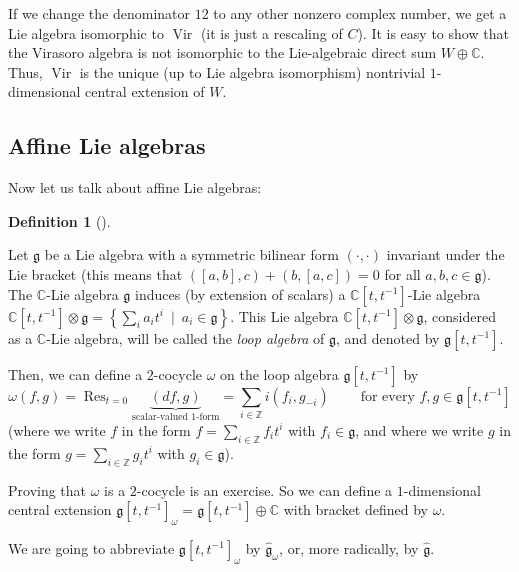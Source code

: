 \documentclass
[numbers=enddot,12pt,final,onecolumn,german,notitlepage]{scrartcl}%
\theoremstyle{definition}
\newtheorem{defi}[theo]{Definition}
\newenvironment{definition}[1][]
{\begin{defi}[#1]\begin{leftbar}}
{\end{leftbar}\end{defi}}
\begin{document}
If we change the denominator $12$ to any other nonzero complex number, we get
a Lie algebra isomorphic to $\operatorname*{Vir}$ (it is just a rescaling of
$C$). It is easy to show that the Virasoro algebra is not isomorphic to the
Lie-algebraic direct sum $W\oplus\mathbb{C}$. Thus, $\operatorname*{Vir}$ is
the unique (up to Lie algebra isomorphism) nontrivial $1$-dimensional central
extension of $W$.

\subsection{Affine Lie algebras}

Now let us talk about affine Lie algebras:

\begin{definition}
\label{def.loop}Let $\mathfrak{g}$ be a Lie algebra with a symmetric bilinear
form $\left(  \cdot,\cdot\right)  $ invariant under the Lie bracket (this
means that $\left(  \left[  a,b\right]  ,c\right)  +\left(  b,\left[
a,c\right]  \right)  =0$ for all $a,b,c\in\mathfrak{g}$). The $\mathbb{C}$-Lie
algebra $\mathfrak{g}$ induces (by extension of scalars) a $\mathbb{C}\left[
t,t^{-1}\right]  $-Lie algebra $\mathbb{C}\left[  t,t^{-1}\right]
\otimes\mathfrak{g}=\left\{  \sum\limits_{i}a_{i}t^{i}\ \mid\ a_{i}%
\in\mathfrak{g}\right\}  $. This Lie algebra $\mathbb{C}\left[  t,t^{-1}%
\right]  \otimes\mathfrak{g}$, considered as a $\mathbb{C}$-Lie algebra, will
be called the \textit{loop algebra} of $\mathfrak{g}$, and denoted by
$\mathfrak{g}\left[  t,t^{-1}\right]  $.

Then, we can define a $2$-cocycle $\omega$ on the loop algebra $\mathfrak{g}%
\left[  t,t^{-1}\right]  $ by%
\begin{equation}
\omega\left(  f,g\right)  =\operatorname*{Res}\nolimits_{t=0}%
\underbrace{\left(  df,g\right)  }_{\text{scalar-valued }1\text{-form}}%
=\sum\limits_{i\in\mathbb{Z}}i\left(  f_{i},g_{-i}\right)
\ \ \ \ \ \ \ \ \ \ \text{for every }f,g\in\mathfrak{g}\left[  t,t^{-1}%
\right]  \label{loop.w}%
\end{equation}
(where we write $f$ in the form $f=\sum\limits_{i\in\mathbb{Z}}f_{i}t^{i}$
with $f_{i}\in\mathfrak{g}$, and where we write $g$ in the form $g=\sum
\limits_{i\in\mathbb{Z}}g_{i}t^{i}$ with $g_{i}\in\mathfrak{g}$).

Proving that $\omega$ is a $2$-cocycle is an exercise. So we can define a
$1$-dimensional central extension $\mathfrak{g}\left[  t,t^{-1}\right]
_{\omega}=\mathfrak{g}\left[  t,t^{-1}\right]  \oplus\mathbb{C}$ with bracket
defined by $\omega$.

We are going to abbreviate $\mathfrak{g}\left[  t,t^{-1}\right]  _{\omega}$ by
$\widehat{\mathfrak{g}}_{\omega}$, or, more radically, by
$\widehat{\mathfrak{g}}$.
\end{definition}
\end{document}
